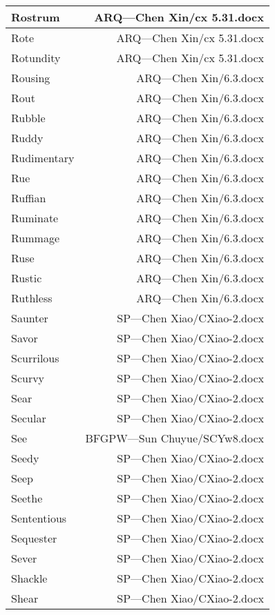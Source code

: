 \documentclass{article}
\begin{document}
\begin{center}
\begin{longtable}{|l|r|}
\hline
Rostrum  &  ARQ---Chen Xin/cx 5.31.docx\\  
\hline
Rote  &  ARQ---Chen Xin/cx 5.31.docx\\  
\hline
Rotundity  &  ARQ---Chen Xin/cx 5.31.docx\\  
\hline
Rousing  &  ARQ---Chen Xin/6.3.docx\\  
\hline
Rout  &  ARQ---Chen Xin/6.3.docx\\  
\hline
Rubble  &  ARQ---Chen Xin/6.3.docx\\  
\hline
Ruddy  &  ARQ---Chen Xin/6.3.docx\\  
\hline
Rudimentary  &  ARQ---Chen Xin/6.3.docx\\  
\hline
Rue  &  ARQ---Chen Xin/6.3.docx\\  
\hline
Ruffian  &  ARQ---Chen Xin/6.3.docx\\  
\hline
Ruminate  &  ARQ---Chen Xin/6.3.docx\\  
\hline
Rummage  &  ARQ---Chen Xin/6.3.docx\\  
\hline
Ruse  &  ARQ---Chen Xin/6.3.docx\\  
\hline
Rustic  &  ARQ---Chen Xin/6.3.docx\\  
\hline
Ruthless  &  ARQ---Chen Xin/6.3.docx\\  
\hline
Saunter  &  SP---Chen Xiao/CXiao-2.docx\\  
\hline
Savor  &  SP---Chen Xiao/CXiao-2.docx\\  
\hline
Scurrilous  &  SP---Chen Xiao/CXiao-2.docx\\  
\hline
Scurvy  &  SP---Chen Xiao/CXiao-2.docx\\  
\hline
Sear  &  SP---Chen Xiao/CXiao-2.docx\\  
\hline
Secular  &  SP---Chen Xiao/CXiao-2.docx\\  
\hline
See  &  BFGPW---Sun Chuyue/SCYw8.docx\\  
\hline
Seedy  &  SP---Chen Xiao/CXiao-2.docx\\  
\hline
Seep  &  SP---Chen Xiao/CXiao-2.docx\\  
\hline
Seethe  &  SP---Chen Xiao/CXiao-2.docx\\  
\hline
Sententious  &  SP---Chen Xiao/CXiao-2.docx\\  
\hline
Sequester  &  SP---Chen Xiao/CXiao-2.docx\\  
\hline
Sever  &  SP---Chen Xiao/CXiao-2.docx\\  
\hline
Shackle  &  SP---Chen Xiao/CXiao-2.docx\\  
\hline
Shear  &  SP---Chen Xiao/CXiao-2.docx\\  

\end{longtable}
\end{center}
\end{document}
